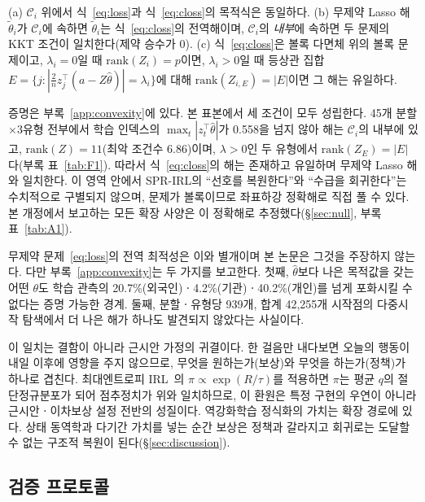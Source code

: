 \begin{proposition}
\label{prop:lasso}
(a) $\mathcal{C}_i$ 위에서 식~\eqref{eq:loss}과 식~\eqref{eq:closs}의 목적식은 동일하다.
(b) 무제약 Lasso 해 $\tilde\theta_i$가 $\mathcal{C}_i$에 속하면 $\tilde\theta_i$는
식~\eqref{eq:closs}의 전역해이며, $\mathcal{C}_i$의 \emph{내부}에 속하면 두 문제의 KKT
조건이 일치한다(제약 승수가 0). (c) 식~\eqref{eq:closs}은 볼록 다면체 위의 볼록 문제이고,
$\lambda_i=0$일 때 $\mathrm{rank}(Z_i)=p$이면, $\lambda_i>0$일 때 등상관 집합
$E=\{j:|\tfrac{2}{n}z_{j}^{\top}(a-Z\hat\theta)|=\lambda_i\}$에 대해
$\mathrm{rank}(Z_{i,E})=|E|$이면 그 해는 유일하다.
\end{proposition}

증명은 부록~\ref{app:convexity}에 있다. 본 표본에서 세 조건이 모두 성립한다. 45개
분할$\times$3유형 전부에서 학습 인덱스의 $\max_t|z_t^{\top}\hat\theta|$가 0.558을 넘지
않아 해는 $\mathcal{C}_i$의 내부에 있고, $\mathrm{rank}(Z)=11$(최악 조건수 6.86)이며,
$\lambda>0$인 두 유형에서 $\mathrm{rank}(Z_E)=|E|$다(부록 표~\ref{tab:F1}). 따라서
식~\eqref{eq:closs}의 해는 존재하고 유일하며 무제약 Lasso 해와 일치한다. 이 영역
안에서 SPR-IRL의 ``선호를 복원한다''와 ``수급을 회귀한다''는 수치적으로 구별되지
않으며, 문제가 볼록이므로 좌표하강 정확해로 직접 풀 수 있다. 본 개정에서 보고하는
모든 확장 사양은 이 정확해로 추정했다(\S\ref{sec:null}, 부록 표~\ref{tab:A1}).

무제약 문제~\eqref{eq:loss}의 전역 최적성은 이와 별개이며 본 논문은 그것을 주장하지
않는다. 다만 부록~\ref{app:convexity}는 두 가지를 보고한다. 첫째, $\hat\theta$보다 나은
목적값을 갖는 어떤 $\theta$도 학습 관측의 20.7\%(외국인)ㆍ4.2\%(기관)ㆍ40.2\%(개인)를
넘게 포화시킬 수 없다는 증명 가능한 경계. 둘째, 분할ㆍ유형당 939개, 합계 42{,}255개
시작점의 다중시작 탐색에서 더 나은 해가 하나도 발견되지 않았다는 사실이다.

이 일치는 결함이 아니라 근시안 가정의 귀결이다. 한 걸음만 내다보면 오늘의 행동이
내일 이후에 영향을 주지 않으므로, 무엇을 원하는가(보상)와 무엇을 하는가(정책)가
하나로 겹친다. 최대엔트로피 IRL~\cite{ziebart2008maximum}의
$\pi\propto\exp(R/\tau)$를 적용하면 $\pi$는 평균 $q$의 절단정규분포가 되어
점추정치가 위와 일치하므로, 이 환원은 특정 구현의 우연이 아니라 근시안ㆍ이차보상
설정 전반의 성질이다. 역강화학습 정식화의 가치는 확장 경로에 있다. 상태 동역학과
다기간 가치를 넣는 순간 보상은 정책과 갈라지고 회귀로는 도달할 수 없는 구조적
복원이 된다(\S\ref{sec:discussion}).

\subsection{검증 프로토콜}
\label{sec:protocol}


